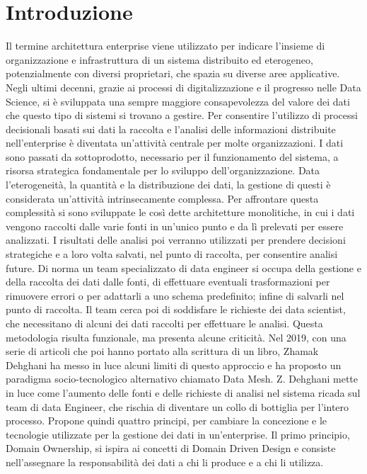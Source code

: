 \documentclass[12pt]{report}
\begin{document}
\chapter*{Introduzione}

Il termine architettura enterprise viene utilizzato per indicare l'insieme di organizzazione e infrastruttura di un sistema distribuito ed eterogeneo, potenzialmente con diversi proprietari, che spazia su diverse aree applicative.
Negli ultimi decenni, grazie ai processi di digitalizzazione e il progresso nelle Data Science, si è sviluppata una sempre maggiore consapevolezza del valore dei dati che questo tipo di sistemi si trovano a gestire.
Per consentire l'utilizzo di processi decisionali basati sui dati la raccolta e l'analisi delle informazioni distribuite nell'enterprise è diventata un'attività centrale per molte organizzazioni.
I dati sono passati da sottoprodotto, necessario per il funzionamento del sistema, a risorsa strategica fondamentale per lo sviluppo dell'organizzazione.
Data l'eterogeneità, la quantità e la distribuzione dei dati, la gestione di questi è  considerata un'attività intrinsecamente complessa.
Per affrontare questa complessità si sono sviluppate le così dette architetture monolitiche, in cui i dati vengono raccolti dalle varie fonti in un'unico punto e da lì prelevati per essere analizzati.
I risultati delle analisi poi verranno utilizzati per prendere decisioni strategiche e a loro volta salvati, nel punto di raccolta, per consentire analisi future.
Di norma un team specializzato di data engineer si occupa della gestione e della raccolta dei dati dalle fonti, di effettuare eventuali trasformazioni per rimuovere errori o per adattarli a uno schema predefinito; infine di salvarli nel punto di raccolta.
Il team cerca poi di soddisfare le richieste dei data scientist, che necessitano di alcuni dei dati raccolti per effettuare le analisi.
Questa metodologia risulta funzionale, ma presenta alcune criticità.
Nel 2019, con una serie di articoli che poi hanno portato alla scrittura di un libro, Zhamak Dehghani ha messo in luce alcuni limiti di questo approccio e ha proposto un paradigma socio-tecnologico alternativo chiamato Data Mesh.
Z. Dehghani mette in luce come l'aumento delle fonti e delle richieste di analisi nel sistema ricada sul team di data Engineer, che rischia di diventare un collo di bottiglia per l'intero processo.
Propone quindi quattro principi, per cambiare la concezione e le tecnologie utilizzate per la gestione dei dati in un'enterprise. 
Il primo principio, Domain Ownership, si ispira ai concetti di Domain Driven Design e consiste nell'assegnare la responsabilità dei dati a chi li produce e a chi li utilizza.
\end{document}
